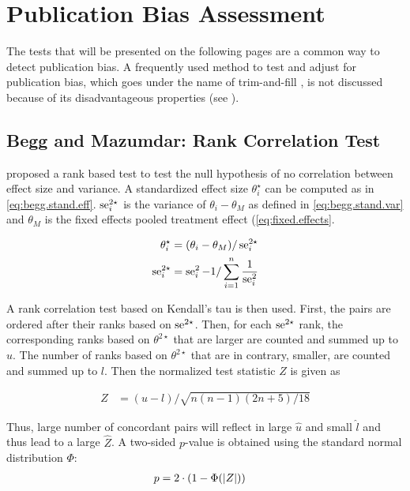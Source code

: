 \documentclass[11pt,a4paper,twoside]{book}\usepackage[]{graphicx}\usepackage[]{color}
\begin{document}
\section{Publication Bias Assessment}
The tests that will be presented on the following pages are a common way to detect publication bias. A frequently used method to test and adjust for publication bias, which goes under the name of trim-and-fill \citep{trimfill}, is not discussed because of its disadvantageous properties (see \eg \citealp{Moreno.2009}).\\

\subsection{Begg and Mazumdar: Rank Correlation Test} \label{sec:Begg}
\citet{Begg} proposed a rank based test to test the null hypothesis of no correlation between effect size and variance.
A standardized effect size $\theta_i^\star$ can be computed as in \eqref{eq:begg.stand.eff}. $\operatorname{se}_i^{2\star}$ is the variance of $\theta_i - \theta_M$ as defined in \eqref{eq:begg.stand.var} and $\theta_M$ is the fixed effects pooled treatment effect (\eqref{eq:fixed.effects}. 

\begin{align}
\theta_i^\star &= (\theta_i - \theta_M)/\operatorname{se}_i^{2\star} \label{eq:begg.stand.eff}  \\
\operatorname{se}_i^{2\star} &= \operatorname{se}_i^2 - 1/\sum_{i = 1}^n\frac{1}{\operatorname{se}_i^2} \label{eq:begg.stand.var} 
\end{align}

A rank correlation test based on Kendall's tau is then used. First, the pairs are ordered after their ranks based on $\operatorname{se}^{2\star}$. Then, for each $\operatorname{se}^{2\star}$ rank, the corresponding ranks based on $\theta^{2\star}$ that are larger are counted and summed up to $u$. The number of ranks based on $\theta^{2\star}$ that are in contrary, smaller, are counted and summed up to $l$. Then the normalized test statistic $Z$ is given as

\begin{align}
Z &= (u - l)/\sqrt{n(n-1)(2n + 5)/18} \nonumber
\end{align}

Thus, large number of concordant pairs will reflect in large $\hat{u}$ and small $\hat{l}$ and thus lead to a large $\hat{Z}$. A two-sided  $p$\hspace{0.4mm}-value is obtained using the standard normal distribution $\Phi$:
\begin{align}
p &= 2\cdot(1-\Phi(\left\lvert Z\right\rvert)) \nonumber
\end{align}
\end{document}

